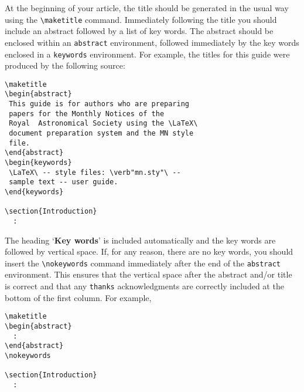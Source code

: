 At the beginning of your article, the title should be generated in the
usual way using the \verb"\maketitle" command. Immediately following
the title you should include an abstract followed by a list of key
words. The abstract should be enclosed within an \verb"abstract"
environment, followed immediately by the key words enclosed in a
\verb"keywords" environment. For example, the titles for this guide
were produced by the following source:
%
\begin{verbatim}
\maketitle
\begin{abstract}
 This guide is for authors who are preparing
 papers for the Monthly Notices of the
 Royal  Astronomical Society using the \LaTeX\
 document preparation system and the MN style
 file.
\end{abstract}
\begin{keywords}
 \LaTeX\ -- style files: \verb"mn.sty"\ --
 sample text -- user guide.
\end{keywords}

\section{Introduction}
  :
\end{verbatim}
%
The heading `{\bf Key words}' is included automatically and the key
words are followed by vertical space. If, for any reason, there are no
key words, you should insert the \verb"\nokeywords" command immediately
after the end of the \verb"abstract" environment. This ensures that the
vertical space after the abstract and/or title is correct and that any
\verb"thanks" acknowledgments are correctly included at the bottom of
the first column. For example,
%
\begin{verbatim}
\maketitle
\begin{abstract}
  :
\end{abstract}
\nokeywords

\section{Introduction}
  :
\end{verbatim}

